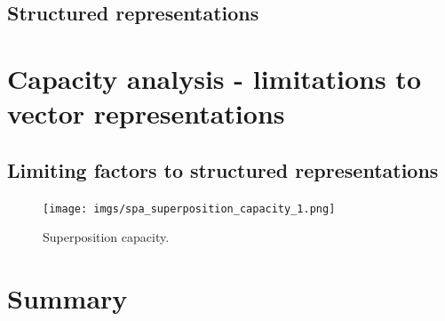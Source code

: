 \subsection{Structured representations}%
\label{subsec:structured_representations}

\section{Capacity analysis - limitations to vector representations}%
\label{sec:capacity_analysis_limitations_to_vector_representations}

\subsection{Limiting factors to structured representations}%
\label{subsec:limiting_factors_to_structured_representations}


\begin{figure}[t]
	\centering
	\texttt{[image: imgs/spa\_superposition\_capacity\_1.png]}
	\caption{Superposition capacity.}
	\label{fig:spa_superposition_capacity}
\end{figure}

\section{Summary}%
\label{sec:vector_representations_automotive_summary}


